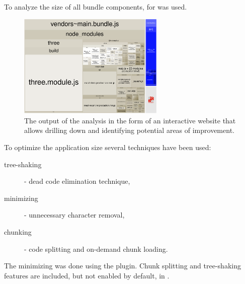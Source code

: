 \medskip
To analyze the size of all bundle components,  for  was used. 

\medskip

\begin{figure}[H]
	\caption{The output of the analysis in the form of an interactive website that allows drilling down and identifying potential areas of improvement.}
  \centering
    \includegraphics[width=0.62\textwidth]{assets/3-bundle.png}
\end{figure}

To optimize the application size several techniques have been used:

\begin{description}
	\item[tree-shaking] - dead code elimination technique,
	\item[minimizing] - unnecessary character removal,
	\item[chunking] - code splitting and on-demand chunk loading.
\end{description}

The minimizing was done using the  plugin. Chunk splitting and tree-shaking features are included, but not enabled by default, in .

